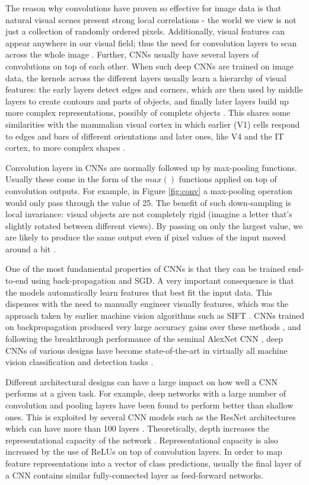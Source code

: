 \documentclass[12pt]{report}
\begin{document}
The reason why convolutions have proven so effective for image data is that natural visual scenes present strong local correlations - the world we view is not just a collection of randomly ordered pixels. Additionally, visual features can appear anywhere in our visual field; thus the need for convolution layers to scan across the whole image \cite{Lecun2015}. Further, CNNs usually have several layers of convolutions on top of each other. When such deep CNNs are trained on image data, the kernels across the different layers usually learn a hierarchy of visual features: the early layers detect edges and corners, which are then used by middle layers to create contours and parts of objects, and finally later layers build up more complex representations, possibly of complete objects \cite{Zeiler2014}. This shares some similarities with the mammalian visual cortex \cite{Cadieu2014} in which earlier (V1) cells respond to edges and bars of different orientations \cite{Hubeld1962} and later ones, like V4 and the IT cortex, to more complex shapes \cite{Kobatake1994}. 

Convolution layers in CNNs are normally followed up by max-pooling functions. Usually these come in the form of the $max()$ functions applied on top of convolution outputs. For example, in Figure \ref{fig:conv} a max-pooling operation would only pass through the value of 25. The benefit of such down-sampling is local invariance: visual objects are not completely rigid (imagine a letter that's slightly rotated between different views). By passing on only the largest value, we are likely to produce the same output even if pixel values of the input moved around a bit \cite{Lecun2015}.

One of the most fundamental properties of CNNs is that they can be trained end-to-end using back-propagation and SGD. A very important consequence is that the models automatically learn features that best fit the input data. This dispenses with the need to manually engineer visually features, which was the approach taken by earlier machine vision algorithms such as SIFT \cite{Lowe1999}. CNNs trained on backpropagation produced very large accuracy gains over these methods \cite{Razavian2014}, and following the breakthrough performance of the seminal AlexNet CNN \cite{Krizhevsky2012}, deep CNNs of various designs have become state-of-the-art in virtually all machine vision classification and detection tasks \cite{JurgenSchmidhuber2015}.

Different architectural designs can have a large impact on how well a CNN performs at a given task. For example, deep networks with a large number of convolution and pooling layers have been found to perform better \cite{Srivastava2015} than shallow ones. This is exploited by several CNN models such as the ResNet architectures which can have more than 100 layers \cite{He2015}. Theoretically, depth increases the representational capacity of the network \cite{Sun2015}. Representational capacity is also increased by the use of ReLUs on top of convolution layers. In order to map feature representations into a vector of class predictions, usually the final layer of a CNN contains similar fully-connected layer as feed-forward networks.
\end{document}
